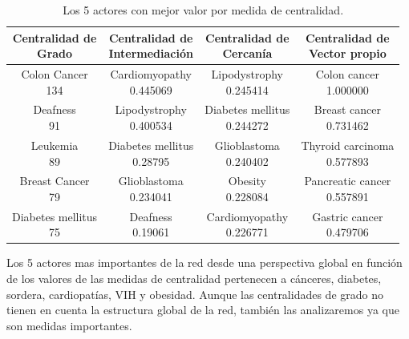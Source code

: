 \documentclass{uimppracticas}
\begin{document}
\begin{table}[H]
	\centering
	\begin{tabular}{ |c|c|c|c| } 
		\hline
		\thead{\textbf{Centralidad de} \\ \textbf{Grado}} & \thead{\textbf{Centralidad de} \\ \textbf{Intermediación}} & 	\thead{\textbf{Centralidad de } \\ \textbf{Cercanía}} & \thead{\textbf{Centralidad de } \\ \textbf{Vector propio}} \\ 
		\hline
		\thead{Colon Cancer \\ 134} & \thead{Cardiomyopathy \\ 0.445069}  & \thead{Lipodystrophy \\ 0.245414} & \thead{Colon cancer \\ 1.000000} \\ 
		\hline
		\thead{Deafness \\ 91} & \thead{Lipodystrophy \\ 0.400534} & \thead{Diabetes mellitus \\ 0.244272} & \thead{Breast cancer \\ 0.731462} \\ 
		\hline
		\thead{Leukemia \\ 89} & \thead{Diabetes mellitus \\ 0.28795} & \thead{Glioblastoma \\ 0.240402} & \thead{Thyroid carcinoma \\ 0.577893} \\ 
		\hline
		\thead{Breast Cancer \\ 79} & \thead{Glioblastoma \\ 0.234041} & \thead{Obesity \\ 0.228084} & \thead{Pancreatic cancer \\ 0.557891} \\ 
		\hline
		\thead{Diabetes mellitus \\ 75} & \thead{Deafness \\ 0.19061} & \thead{Cardiomyopathy \\ 0.226771} & \thead{Gastric cancer \\ 0.479706} \\ 
		\hline 
	\end{tabular}
	\caption{Los 5 actores con mejor valor por medida de centralidad.}
\end{table}

Los 5 actores mas importantes de la red desde una perspectiva global en función de los valores de las medidas de centralidad pertenecen a cánceres, diabetes, sordera, cardiopatías, VIH y obesidad. Aunque las centralidades de grado no tienen en cuenta la estructura global de la red, también las analizaremos ya que son medidas importantes.
\end{document}
